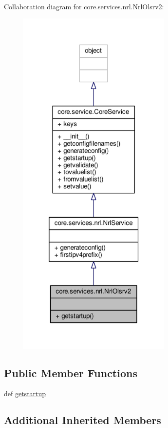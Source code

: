 Collaboration diagram for core.\+services.\+nrl.\+Nrl\+Olsrv2\+:
\nopagebreak
\begin{figure}[H]
\begin{center}
\leavevmode
\includegraphics[width=217pt]{classcore_1_1services_1_1nrl_1_1_nrl_olsrv2__coll__graph}
\end{center}
\end{figure}
\subsection*{Public Member Functions}
\begin{DoxyCompactItemize}
\item 
def \hyperlink{classcore_1_1services_1_1nrl_1_1_nrl_olsrv2_ac2675472d33c687174dd4c4ae1375f5a}{getstartup}
\end{DoxyCompactItemize}
\subsection*{Additional Inherited Members}


